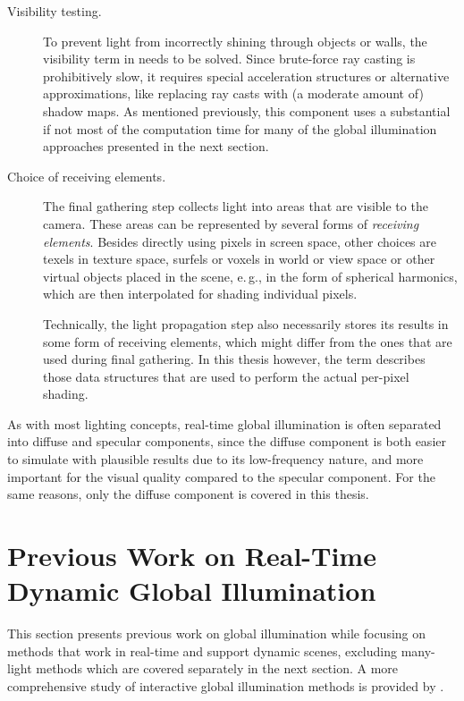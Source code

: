 \begin{description}
    \item[Visibility testing.] To prevent light from incorrectly shining through objects or walls, the visibility term in  needs to be solved. Since brute-force ray casting is prohibitively slow, it requires special acceleration structures or alternative approximations, like replacing ray casts with (a moderate amount of) shadow maps. As mentioned previously, this component uses a substantial if not most of the computation time for many of the global illumination approaches presented in the next section.
    \item[Choice of receiving elements.]
    The final gathering step collects light into areas that are visible to the camera. These areas can be represented by several forms of \textit{receiving elements}. Besides directly using pixels in screen space, other choices are texels in texture space, surfels or voxels in world or view space or other virtual objects placed in the scene, e.\,g., in the form of spherical harmonics, which are then interpolated for shading individual pixels.

    Technically, the light propagation step also necessarily stores its results in some form of receiving elements, which might differ from the ones that are used during final gathering. In this thesis however, the term describes those data structures that are used to perform the actual per-pixel shading.
\end{description}%
%
As with most lighting concepts, real-time global illumination is often separated into diffuse and specular components, since the diffuse component is both easier to simulate with plausible results due to its low-frequency nature, and more important for the visual quality compared to the specular component. For the same reasons, only the diffuse component is covered in this thesis.



\section{Previous Work on Real-Time Dynamic Global Illumination}
\label{sec:intro:gi:previousWork}

This section presents previous work on global illumination while focusing on methods that work in real-time and support dynamic scenes, excluding many-light methods which are covered separately in the next section. A more comprehensive study of interactive global illumination methods is provided by \citet{Ritschel:2012:GISTAR}.

